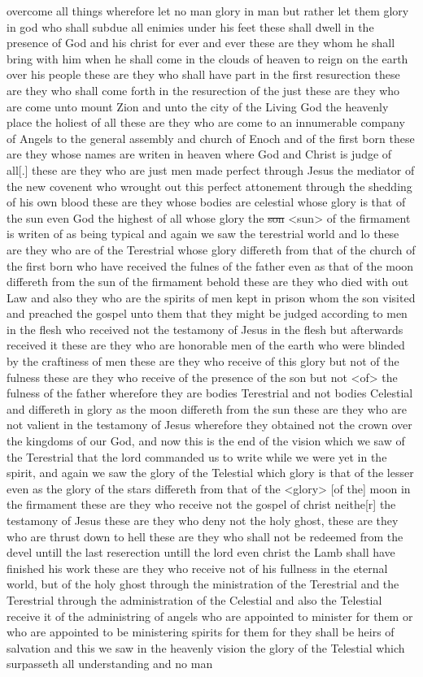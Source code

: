 overcome all things wherefore let no man glory in man but rather let them glory in god who shall subdue all enimies under his feet these shall dwell in the presence of God and his christ for ever and ever these are they whom he shall bring with him when he shall come in the clouds of heaven to reign on the earth over his people these are they who shall have part in the first resurection these are they who shall come forth in the resurection of the just these are they who are come unto mount Zion and unto the city of the Living God the heavenly place the holiest of all these are they who are come to an innumerable company of Angels to the general assembly and church of Enoch and of the first born these are they whose names are writen in heaven where God and Christ is judge of all[.] these are they who are just men made perfect through Jesus the mediator of the new covenent who wrought out this perfect attonement through the shedding of his own blood these are they whose bodies are celestial whose glory is that of the sun even God the highest of all whose glory the \sout{son} <sun> of the firmament is writen of as being typical and again we saw the terestrial world and lo these are they who are of the Terestrial whose glory differeth from that of the church of the first born who have received the fulnes of the father even as that of the moon differeth from the sun of the firmament behold these are they who died with out Law and also they who are the spirits of men kept in prison whom the son visited and preached the gospel unto them that they might be judged according to men in the flesh who received not the testamony of Jesus in the flesh but afterwards received it these are they who are honorable men of the earth who were blinded by the craftiness of men these are they who receive of this glory but not of the fulness these are they who receive of the presence of the son but not <of> the fulness of the father wherefore they are bodies Terestrial and not bodies Celestial and differeth in glory as the moon differeth from the sun these are they who are not valient in the testamony of Jesus wherefore they obtained not the crown over the kingdoms of our God, and now this is the end of the vision which we saw of the Terestrial that the lord commanded us to write while we were yet in the spirit, and again we saw the glory of the Telestial which glory is that of the lesser even as the glory of the stars differeth from that of the <glory> [of the] moon in the firmament these are they who receive not the gospel of christ neithe[r] the testamony of Jesus these are they who deny not the holy ghost, these are they who are thrust down to hell these are they who shall not be redeemed from the devel untill the last reserection untill the lord even christ the Lamb shall have finished his work these are they who receive not of his fullness in the eternal world, but of the holy ghost through the ministration of the Terestrial and the Terestrial through the administration of the Celestial and also the Telestial receive it of the administring of angels who are appointed to minister for them or who are appointed to be ministering spirits for them for they shall be heirs of salvation and this we saw in the heavenly vision the glory of the Telestial which surpasseth all understanding and no man 